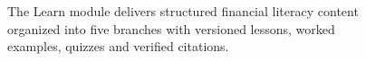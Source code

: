 
\begin{figure}[H]
\centering
{}
\caption{The Learn module delivers structured financial literacy content organized into five branches with versioned lessons, worked examples, quizzes and verified citations.}
\label{fig:learn}
\end{figure}